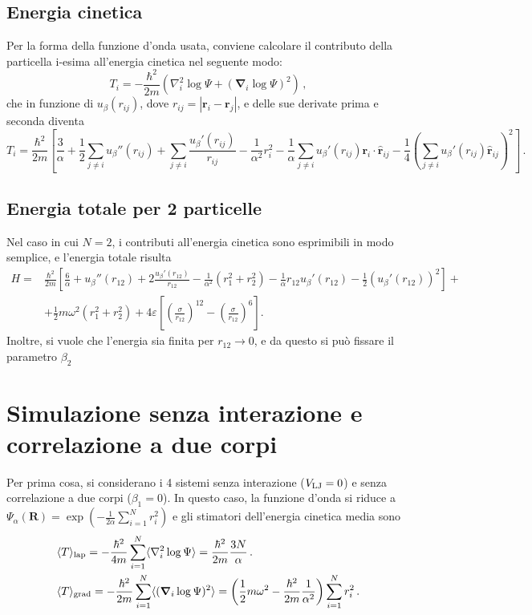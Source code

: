 \documentclass[a4paper, titlepage]{article}
\begin{document}
\subsection{Energia cinetica}
Per la forma della funzione d'onda usata, conviene calcolare il contributo della particella i-esima all'energia cinetica nel seguente modo:
\[
T_i = -\frac{\hbar^2}{2m}\left(\nabla_i^2\log\Psi + (\boldsymbol{\nabla}_i\log\Psi)^2\right)\, ,
\]
che in funzione di $u_\beta(r_{ij})$, dove $r_{ij} = |\mathbf{r}_i - \mathbf{r}_j|$, e delle sue derivate prima e seconda diventa
\[
T_i = \frac{\hbar^2}{2m}
\left[
\frac{3}{\alpha} + 
\frac{1}{2}\sum_{j\neq i} u_\beta''(r_{ij}) + 
\sum_{j\neq i} \frac{u_\beta'(r_{ij})}{r_{ij}} -
\frac{1}{\alpha^2}r_i^2 - 
\frac{1}{\alpha} \sum_{j\neq i} u_\beta'(r_{ij}) \mathbf{r}_i \cdot \hat{\mathbf{r}}_{ij} - 
\frac{1}{4}\left(\sum_{j\neq i} u_\beta'(r_{ij}) \hat{\mathbf{r}}_{ij}\right)^2
\right]\, .
\]

\subsection{Energia totale per 2 particelle}
Nel caso in cui $N = 2$, i contributi all'energia cinetica sono esprimibili in modo semplice, e l'energia totale risulta
\begin{equation}
    \begin{split}
    H = &\frac{\hbar^2}{2m}
    \left[
    \frac{6}{\alpha} +
    u_\beta''(r_{12}) +
    2\frac{u_\beta'(r_{12})}{r_{12}} -
    \frac{1}{\alpha^2}(r_1^2 + r_2^2) - 
    \frac{1}{\alpha}r_{12}u_\beta'(r_{12}) - 
    \frac{1}{2}(u_\beta'(r_{12}))^2
    \right] + \\
    &+\frac{1}{2}m\omega^2(r_1^2 + r_2^2) + 
    4\varepsilon\left[\left(\frac{\sigma}{r_{12}}\right)^{12} - \left(\frac{\sigma}{r_{12}}\right)^{6}\right].
    \end{split}
\end{equation}
Inoltre, si vuole che l'energia sia finita per $r_{12}\rightarrow 0$, e da questo si può fissare il parametro $\beta_2$

\section{Simulazione senza interazione e correlazione a due corpi}
Per prima cosa, si considerano i 4 sistemi senza interazione ($V_{\rm LJ} = 0$) e senza correlazione a due corpi ($\beta_1 = 0$). In questo caso, la funzione d'onda si riduce a $\Psi_\alpha(\mathbf{R}) = \exp(-\frac{1}{2\alpha}\sum_{i = 1}^Nr_i^2)$ e gli stimatori dell'energia cinetica media sono
\begin{align*}
    &\langle T \rangle _{\rm lap} = -\frac{\hbar^2}{4m}
    \sum_{i = 1}^N
    \langle\nabla_i^2\log\Psi\rangle = \frac{\hbar^2}{2m} \frac{3N}{\alpha}\, .\\
    &\langle T \rangle _{\rm grad} = -\frac{\hbar^2}{2m}
    \sum_{i = 1}^N
    \langle(\boldsymbol{\nabla}_i\log\Psi)^2\rangle =
    \left(\frac{1}{2}m\omega^2 -  \frac{\hbar^2}{2m} \frac{1}{\alpha^2}\right)
    \sum_{i=1}^N r_i^2\, .
\end{align*}
\end{document}
